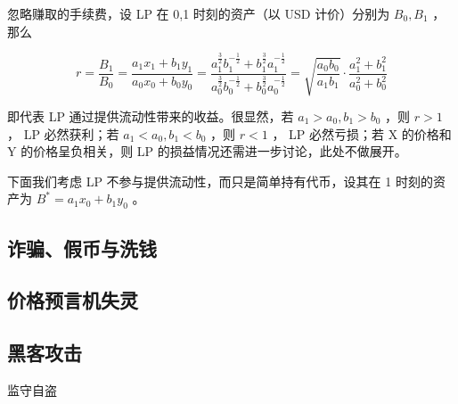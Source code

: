 \documentclass[12pt, a4paper, oneside]{ctexart}
\begin{document}
忽略赚取的手续费，设 LP 在 0,1 时刻的资产（以 USD 计价）分别为 $B_0,B_1$ ，那么

\begin{equation}
    r = \frac{B_1}{B_0} 
    = \frac{a_1x_1+b_1y_1}{a_0x_0+b_0y_0} 
    = \frac{a_1^{\frac{3}{2}}b_1^{-\frac{1}{2}} + b_1^{\frac{3}{2}}a_1^{-\frac{1}{2}}}{a_0^{\frac{3}{2}}b_0^{-\frac{1}{2}} + b_0^{\frac{3}{2}}a_0^{-\frac{1}{2}}} 
    = \sqrt{\frac{a_0b_0}{a_1b_1}} \cdot \frac{a_1^2+b_1^2}{a_0^2+b_0^2}
\end{equation}

\noindent 即代表 LP 通过提供流动性带来的收益。很显然，若 $a_1>a_0,b_1>b_0$ ，则 $r>1$ ， LP 必然获利；若 $a_1<a_0,b_1<b_0$ ，则 $r<1$ ， LP 必然亏损；若 X 的价格和 Y 的价格呈负相关，则 LP 的损益情况还需进一步讨论，此处不做展开。

下面我们考虑 LP 不参与提供流动性，而只是简单持有代币，设其在 1 时刻的资产为 $B^* = a_1x_0+b_1y_0$ 。

\subsection{诈骗、假币与洗钱}

\subsection{价格预言机失灵}

\subsection{黑客攻击}

监守自盗
\end{document}
